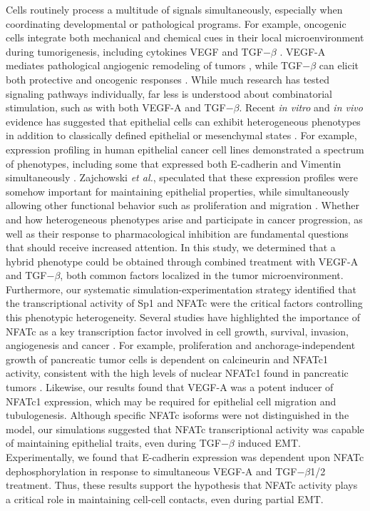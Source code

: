 \documentclass[12pt]{article}
\begin{document}
Cells routinely process a multitude of signals simultaneously, especially when coordinating developmental or pathological programs.
For example, oncogenic cells integrate both mechanical and chemical cues in their local microenvironment during tumorigenesis, including cytokines VEGF and TGF$-\beta$ \citep{Hong:2013mi}.
VEGF-A mediates pathological angiogenic remodeling of tumors \citep{Nagy:2007lh}, while TGF$-\beta$ can elicit both protective and oncogenic responses \citep{Ferrara:2002kx,Willis:2007uq}.
While much research has tested signaling pathways individually, far less is understood about combinatorial stimulation, such as with both VEGF-A and TGF$-\beta$.
Recent \emph{in vitro} and \emph{in vivo} evidence has suggested that epithelial cells can exhibit heterogeneous phenotypes in addition to classically defined epithelial or mesenchymal states \citep{Polyak2009,Strauss:2011fk}.
For example, expression profiling in human epithelial cancer cell lines demonstrated a spectrum of phenotypes, including some that expressed both E-cadherin and Vimentin simultaneously \citep{Neve:2006uq,Welch-Reardon:2014aa}.
Zajchowski \emph{et al.}, speculated that these expression profiles were somehow important for maintaining epithelial properties, while simultaneously allowing other functional behavior such as proliferation and migration \citep{Zajchowski:2001kx}.
Whether and how heterogeneous phenotypes arise and participate in cancer progression, as well as their response to pharmacological inhibition are fundamental questions
that should receive increased attention.
In this study, we determined that a hybrid phenotype could be obtained through combined treatment with VEGF-A and TGF$-\beta$, both common factors localized in the tumor microenvironment.
Furthermore, our systematic simulation-experimentation strategy identified that the transcriptional activity of Sp1 and NFATc were the critical factors controlling this phenotypic heterogeneity.
Several studies have highlighted the importance of NFATc as a key transcription factor involved in cell growth, survival, invasion, angiogenesis and cancer \citep{Mancini2009}.
For example, proliferation and anchorage-independent growth of pancreatic tumor cells is dependent on calcineurin and NFATc1 activity, consistent with the high levels of nuclear NFATc1 found in pancreatic tumors \citep{Singh:2010jx}.
Likewise, our results found that VEGF-A was a potent inducer of NFATc1 expression, which may be required for epithelial cell migration and tubulogenesis.
Although specific NFATc isoforms were not distinguished in the model, our simulations suggested that NFATc transcriptional activity was capable of maintaining epithelial traits, even during TGF$-\beta$ induced EMT.
Experimentally, we found that E-cadherin expression was dependent upon NFATc dephosphorylation in response to simultaneous VEGF-A and TGF$-\beta$1/2 treatment.
Thus, these results support the hypothesis that NFATc activity plays a critical role in maintaining cell-cell contacts, even during partial EMT.
\end{document}

